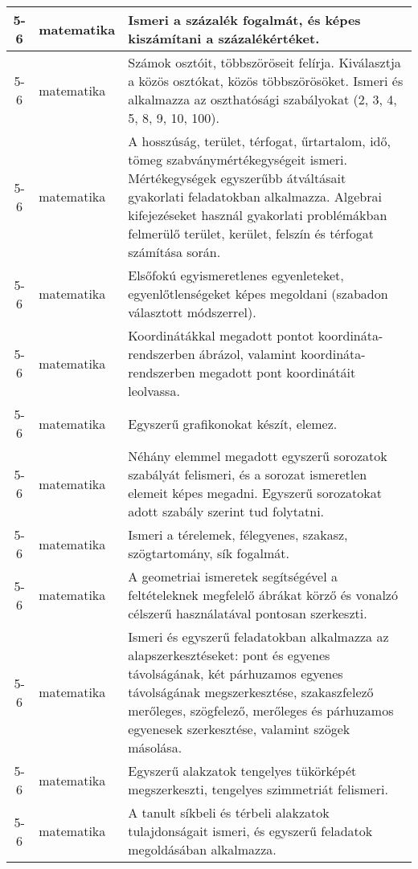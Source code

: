 \begin{small}
\begin{longtable}{c | p{2cm} |  p{11cm} }
              5-6 & matematika & Ismeri a százalék fogalmát, és képes kiszámítani a százalékértéket. \\ \hline
              5-6 & matematika & Számok osztóit, többszöröseit felírja. Kiválasztja a közös osztókat, közös többszörösöket. Ismeri és alkalmazza az oszthatósági szabályokat (2, 3, 4, 5, 8, 9, 10, 100). \\ \hline
              5-6 & matematika & A hosszúság, terület, térfogat, űrtartalom, idő, tömeg szabványmértékegységeit ismeri. Mértékegységek egyszerűbb átváltásait gyakorlati feladatokban alkalmazza. Algebrai kifejezéseket használ gyakorlati problémákban felmerülő  terület, kerület, felszín és térfogat számítása során. \\ \hline
              5-6 & matematika & Elsőfokú egyismeretlenes egyenleteket, egyenlőtlenségeket képes megoldani (szabadon választott módszerrel). \\ \hline
              5-6 & matematika & Koordinátákkal megadott pontot koordináta-rendszerben ábrázol, valamint koordináta-rendszerben megadott pont koordinátáit leolvassa. \\ \hline
              5-6 & matematika & Egyszerű grafikonokat készít, elemez. \\ \hline
              5-6 & matematika & Néhány elemmel megadott egyszerű sorozatok szabályát felismeri, és a sorozat ismeretlen elemeit képes megadni. Egyszerű sorozatokat adott szabály szerint tud folytatni. \\ \hline
              5-6 & matematika & Ismeri a térelemek, félegyenes, szakasz, szögtartomány, sík fogalmát. \\ \hline
              5-6 & matematika & A geometriai ismeretek segítségével a feltételeknek megfelelő ábrákat körző és vonalzó célszerű használatával pontosan szerkeszti. \\ \hline
              5-6 & matematika & Ismeri és egyszerű feladatokban alkalmazza az alapszerkesztéseket: pont és egyenes távolságának, két párhuzamos egyenes távolságának megszerkesztése, szakaszfelező merőleges, szögfelező, merőleges és párhuzamos egyenesek szerkesztése, valamint szögek másolása. \\ \hline
              5-6 & matematika & Egyszerű alakzatok tengelyes tükörképét megszerkeszti, tengelyes szimmetriát felismeri. \\ \hline
              5-6 & matematika & A tanult síkbeli és térbeli alakzatok tulajdonságait ismeri, és egyszerű feladatok megoldásában alkalmazza. \\ \hline

\end{longtable}
\end{small}
